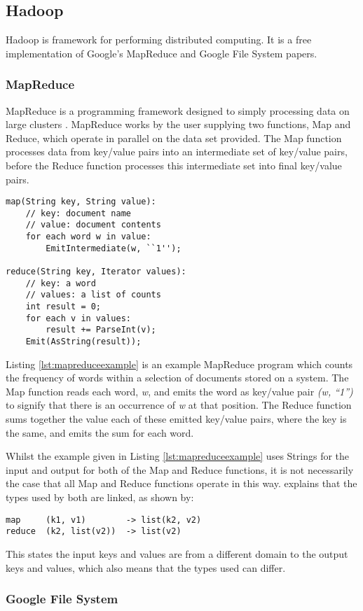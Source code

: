 \subsection{Hadoop}
Hadoop is framework for performing distributed computing. It is a free implementation of Google's MapReduce and Google File System papers.

\subsubsection{MapReduce}
MapReduce is a programming framework designed to simply processing data on large clusters \cite{mapreduce}. MapReduce works by the user supplying two functions, Map and Reduce, which operate in parallel on the data set provided. The Map function processes data from key/value pairs into an intermediate set of key/value pairs, before the Reduce function processes this intermediate set into final key/value pairs.

\begin{lstlisting}[float]
map(String key, String value):
	// key: document name
	// value: document contents
	for each word w in value:
		EmitIntermediate(w, ``1'');
		
reduce(String key, Iterator values):
	// key: a word
	// values: a list of counts
	int result = 0;
	for each v in values:
		result += ParseInt(v);
	Emit(AsString(result));	
\end{lstlisting}

Listing \ref{lst:mapreduceexample} is an example MapReduce program which counts the frequency of words within a selection of documents stored on a system. The Map function reads each word, \emph{w}, and emits the word as key/value pair \emph{(w, ``1'')} to signify that there is an occurrence of \emph{w} at that position. The Reduce function sums together the value each of these emitted key/value pairs, where the key is the same, and emits the sum for each word.

Whilst the example given in Listing \ref{lst:mapreduceexample} uses Strings for the input and output for both of the Map and Reduce functions, it is not necessarily the case that all Map and Reduce functions operate in this way. \cite{mapreduce} explains that the types used by both are linked, as shown by:

\begin{verbatim}
map     (k1, v1)        -> list(k2, v2)
reduce  (k2, list(v2))  -> list(v2)
\end{verbatim}

This states the input keys and values are from a different domain to the output keys and values, which also means that the types used can differ.

\subsubsection{Google File System}
